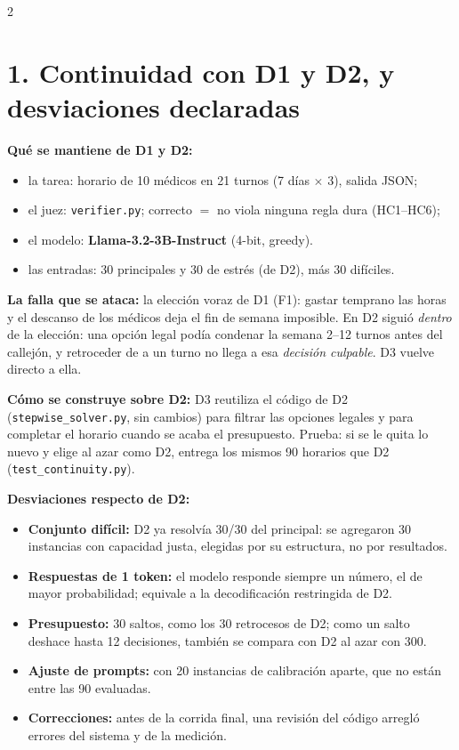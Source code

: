 \documentclass[9pt,a4paper]{extarticle}
\begin{document}
\raggedcolumns
\begin{multicols}{2}

\section{1. Continuidad con D1 y D2, y desviaciones declaradas}
\textbf{Qué se mantiene de D1 y D2:}
\begin{itemize}[label=$\blacktriangleright$]
    \item la tarea: horario de 10 médicos en 21 turnos (7 días $\times$ 3), salida JSON;
    \item el juez: \texttt{verifier.py}; correcto $=$ no viola ninguna regla dura (HC1--HC6);
    \item el modelo: \textbf{Llama-3.2-3B-Instruct} (4-bit, greedy).
    \item las entradas: 30 principales y 30 de estrés (de D2), más 30 difíciles.
\end{itemize}
\textbf{La falla que se ataca:} la elección voraz de D1 (F1): gastar temprano las horas y el descanso de los médicos deja el fin de semana imposible. En D2 siguió \emph{dentro} de la elección: una opción legal podía condenar la semana 2--12 turnos antes del callejón, y retroceder de a un turno no llega a esa \emph{decisión culpable}. D3 vuelve directo a ella.\par
\textbf{Cómo se construye sobre D2:} D3 reutiliza el código de D2 (\texttt{stepwise\_solver.py}, sin cambios) para filtrar las opciones legales y para completar el horario cuando se acaba el presupuesto. Prueba: si se le quita lo nuevo y elige al azar como D2, entrega los mismos 90 horarios que D2 (\texttt{test\_continuity.py}).\par
\textbf{Desviaciones respecto de D2:}
\begin{itemize}[label=$\blacktriangleright$]
    \item \textbf{Conjunto difícil:} D2 ya resolvía 30/30 del principal: se agregaron 30 instancias con capacidad justa, elegidas por su estructura, no por resultados.
    \item \textbf{Respuestas de 1 token:} el modelo responde siempre un número, el de mayor probabilidad; equivale a la decodificación restringida de D2.
    \item \textbf{Presupuesto:} 30 saltos, como los 30 retrocesos de D2; como un salto deshace hasta 12 decisiones, también se compara con D2 al azar con 300.
    \item \textbf{Ajuste de prompts:} con 20 instancias de calibración aparte, que no están entre las 90 evaluadas.
    \item \textbf{Correcciones:} antes de la corrida final, una revisión del código arregló errores del sistema y de la medición.
\end{itemize}


\end{multicols}
\end{document}
